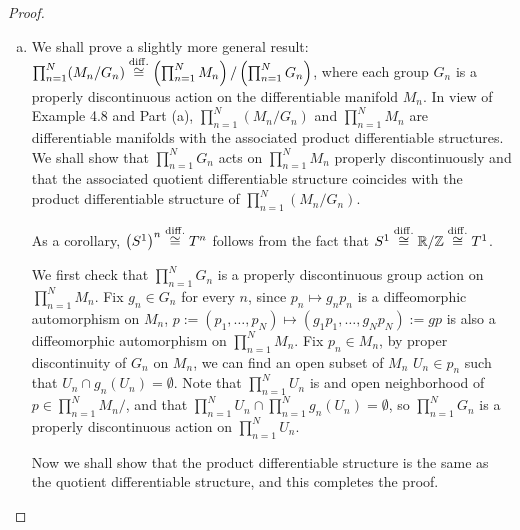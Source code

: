 {\begin{proof}
\begin{enumerate}[(a)]
	\item
	We shall prove a slightly more general result: $\prod_{n=1}^N (M_n/G_n) \stackrel{\mathrm{diff.}}{\cong} \left(\prod_{n=1}^N M_n\right)/\left(\prod_{n=1}^N G_n\right)$, where each group $G_n$ is a properly discontinuous action on the differentiable manifold $M_n$. In view of Example 4.8 and Part (a), $\prod_{n=1}^N (M_n/G_n)$ and $\prod_{n=1}^N M_n$ are differentiable manifolds with the associated product differentiable structures. We shall show that $\prod_{n=1}^N G_n$ acts on $\prod_{n=1}^N M_n$ properly discontinuously and that the associated quotient differentiable structure coincides with the product differentiable structure of $\prod_{n=1}^N (M_n/G_n)$.
	\par
	As a corollary, $\left(S^1\right)^n \stackrel{\mathrm{diff.}}{\cong} T^n$ follows from the fact that $S^1 \stackrel{\mathrm{diff.}}{\cong} \mathbb{R}/\mathbb{Z} \stackrel{\mathrm{diff.}}{\cong} T^1$.
	\par
	We first check that $\prod_{n=1}^N G_n$ is a properly discontinuous group action on $\prod_{n=1}^N M_n$. Fix $g_n \in G_n$ for every $n$, since $p_n \mapsto g_n p_n$ is a diffeomorphic automorphism on $M_n$, $p:=(p_1,\dots,p_N) \mapsto (g_1 p_1, \dots, g_N p_N):=g p$ is also a diffeomorphic automorphism on $\prod_{n=1}^N M_n$. Fix $p_n \in M_n$, by proper discontinuity of $G_n$ on $M_n$, we can find an open subset of $M_n$ $U_n \in p_n$ such that $U_n \cap g_n(U_n) = \emptyset$. Note that $\prod_{n=1}^N U_n$ is and open neighborhood of $p \in \prod_{n=1}^N M_n/$, and that $\prod_{n=1}^N U_n \cap \prod_{n=1}^N g_n(U_n) = \emptyset$, so $\prod_{n=1}^N G_n$ is a properly discontinuous action on $\prod_{n=1}^N U_n$.
	\par
	Now we shall show that the product differentiable structure is the same as the quotient differentiable structure, and this completes the proof. 
	
\end{enumerate}
\end{proof}

}